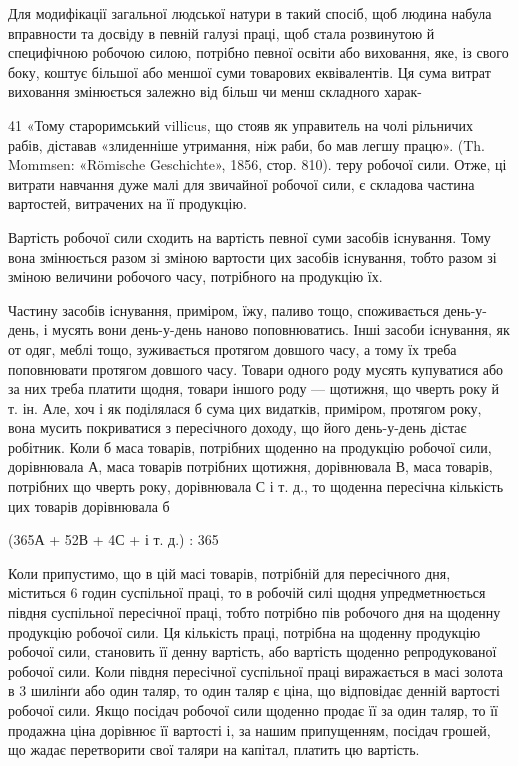Для модифікації загальної людської натури в такий спосіб,
щоб людина набула вправности та досвіду в певній галузі праці,
щоб стала розвинутою й специфічною робочою силою, потрібно
певної освіти або виховання, яке, із свого боку, коштує більшої
або меншої суми товарових еквівалентів. Ця сума витрат виховання
змінюється залежно від більш чи менш складного харак-

41 «Тому староримський villicus, що стояв як управитель на чолі
рільничих рабів, діставав «злиденніше утримання, ніж раби, бо мав
легшу працю». (Th. Mommsen: «Römische Geschichte», 1856, стор. 810).
теру робочої сили. Отже, ці витрати навчання дуже малі для
звичайної робочої сили, є складова частина вартостей, витрачених
на її продукцію.

Вартість робочої сили сходить на вартість певної суми засобів
існування. Тому вона змінюється разом зі зміною вартости цих
засобів існування, тобто разом зі зміною величини робочого
часу, потрібного на продукцію їх.

Частину засобів існування, приміром, їжу, паливо тощо, споживається
день-у-день, і мусять вони день-у-день наново поповнюватись.
Інші засоби існування, як от одяг, меблі тощо,
зуживається протягом довшого часу, а тому їх треба поповнювати
протягом довшого часу. Товари одного роду мусять купуватися
або за них треба платити щодня, товари іншого роду —
щотижня, що чверть року й т. ін. Але, хоч і як поділялася б
сума цих видатків, приміром, протягом року, вона мусить покриватися
з пересічного доходу, що його день-у-день дістає робітник.
Коли б маса товарів, потрібних щоденно на продукцію
робочої сили, дорівнювала А, маса товарів потрібних щотижня,
дорівнювала В, маса товарів, потрібних що чверть року, дорівнювала
С і т. д., то щоденна пересічна кількість цих товарів
дорівнювала б

(365А + 52В + 4С + і т. д.) : 365

Коли припустимо, що в цій масі товарів, потрібній для пересічного
дня, міститься 6 годин суспільної праці, то в робочій силі
щодня упредметнюється півдня суспільної пересічної праці, тобто
потрібно пів робочого дня на щоденну продукцію робочої сили.
Ця кількість праці, потрібна на щоденну продукцію робочої
сили, становить її денну вартість, або вартість щоденно репродукованої
робочої сили. Коли півдня пересічної суспільної праці
виражається в масі золота в 3 шилінґи або один таляр, то один
таляр є ціна, що відповідає денній вартості робочої сили. Якщо
посідач робочої сили щоденно продає її за один таляр, то її продажна
ціна дорівнює її вартості і, за нашим припущенням, посідач
грошей, що жадає перетворити свої таляри на капітал, платить
цю вартість.

